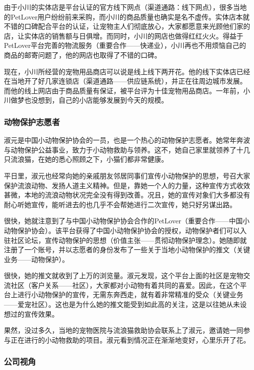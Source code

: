 \documentclass[a4paper]{ctexart}
\begin{document}
由于小川的实体店是平台认证的官方线下网点（渠道通路：线下网点），很多当地的PetLover用户纷纷前来采购，而小川的商品质量也确实是名不虚传。实体店本就不错的口碑配合平台的认证，让宠物主人们彻底放心，大家都愿意来光顾他们家的店，让实体店的销售额与日俱增。而同时，小川的网店也做得红红火火。得益于PetLover平台完善的物流服务（重要合作——快递业），小川再也不用烦恼自己的商品的邮寄问题了，他的网店也取得了不错的口碑。

现在，小川所经营的宠物用品商店可以说是线上线下两开花。他的线下实体店已经在当地开了好几家连锁店（渠道通路——供应链系统），并正在往周边城市发展。而他的线上网店由于商品质量有保证，被平台评为十佳宠物用品商店。一年前，小川做梦也没想到，自己的小店能够发展到今天的规模。

\subsubsection{动物保护志愿者}

淑元是中国小动物保护协会的一员，也是一个热心的动物保护志愿者。她常年奔波与动物保护公益事业，致力于小动物救助与领养。这不，她自己家里就领养了十几只流浪猫，在她的悉心照顾之下，小猫们都非常健康。

平日里，淑元也经常向她的亲戚朋友邻居同事们宣传小动物保护的思想，号召大家保护流浪动物、发扬人道主义精神。但是，靠她一个人的力量，这种宣传方式收效甚微，本地的流浪动物状况完全没有得到改善。况且，她的宣传对象们大多都没有耐心听她宣传，能听进去的也几乎不会帮她进行二次宣传，她只好另谋出路。

很快，她就注意到了与中国小动物保护协会合作的PetLover（重要合作——中国小动物保护协会）。该平台获得了中国小动物保护协会的授权，动物保护者们可以入驻社区论坛，宣传动物保护的思想（价值主张——贯彻动物保护理念）。她随即就注册了一个账号，并以志愿者的身份发布了一些关于当地小动物保护的推文（关键业务——动物保护）。

很快，她的推文就收到了上万的浏览量。淑元发现，这个平台上面的社区是宠物交流社区（客户关系——社区），大家都对小动物有着共同的喜爱。因此，在这个平台上进行小动物保护的宣传，无需东奔西走，就有着非常精准的受众（关键业务——爱宠社区）。这也是为什么她的推文能受到如此高的关注，这是以往她从未设想过的宣传效果。

果然，没过多久，当地的宠物医院与流浪猫救助协会联系上了淑元，邀请她一同参与正在进行的小动物救助的项目。淑元看到情况正在渐渐地变好，心里乐开了花。

\subsubsection{公司视角}
\end{document}

